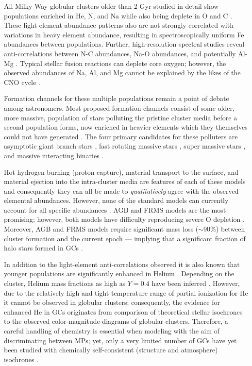 All Milky Way globular clusters older than 2 Gyr studied in detail show
populations enriched in He, N, and Na while also being deplete in O and C
\citep{Piotto2015,Bastian2018}. These light element abundance patterns also are
not strongly correlated with variations in heavy element abundance, resulting
in spectroscopically uniform Fe abundances between populations. Further,
high-resolution spectral studies reveal anti-correlations between N-C
abundances, Na-O abundances, and potentially Al-Mg \citep{Sneden1992,
Gratton2012}. Typical stellar fusion reactions can deplete core oxygen;
however, the observed abundances of Na, Al, and Mg cannot be explained by the
likes of the CNO cycle \citep{Prantzos2007}.

Formation channels for these multiple populations remain a point of debate
among astronomers. Most proposed formation channels consist of some older,
more massive, population of stars polluting the pristine cluster media before a
second population forms, now enriched in heavier elements which they themselves could
not have generated \citep[for a detailed review see ][]{Gratton2012}. The four
primary candidates for these polluters are asymptotic giant branch stars
\citep[AGBs,][]{Ventura2001,DErcole2010}, fast rotating massive stars
\citep[FRMSs,][]{Decressin2007}, super massive stars
\citep[SMSs,][]{Denissenkov2014}, and massive interacting binaries
\citep[MIBs,][]{deMink2009, Bastian2018}. 

Hot hydrogen burning (proton capture), material transport to the surface, and
material ejection into the intra-cluster media are features of each of these
models and consequently they can all be made to {\it qualitatively} agree with
the observed elemental abundances. However, none of the standard models can
currently account for all specific abundances \citep{Gratton2012}. AGB and FRMS
models are the most promising; however, both models have difficulty reproducing
severe O depletion \citep{Ventura2009,Decressin2007}. Moreover, AGB and FRMS
models require significant mass loss ($\sim 90\%$) between cluster formation
and the current epoch --- implying that a significant fraction of halo stars
formed in GCs \citep{Renzini2008,DErcole2008,Bastian2015}.

In addition to the light-element anti-correlations observed it is also known
that younger populations are significantly enhanced in Helium
\citep{Piotto2007, Piotto2015, Latour2019}. Depending on the cluster, Helium
mass fractions as high as $Y=0.4$ have been inferred \citep[e.g][]{Milone2015}.
However, due to the relatively high and tight temperature range of partial
ionization for He it cannot be observed in globular clusters; consequently, the
evidence for enhanced He in GCs originates from comparison of theoretical
stellar isochrones to the observed color-magnitude-diagrams of globular
clusters. Therefore, a careful handling of chemistry is essential when modeling
with the aim of discriminating between MPs; yet, only a very limited number of
GCs have yet been studied with chemically self-consistent (structure and
atmosphere) isochrones \citep[e.g.][NGC 6752]{Dotter2015}. 


